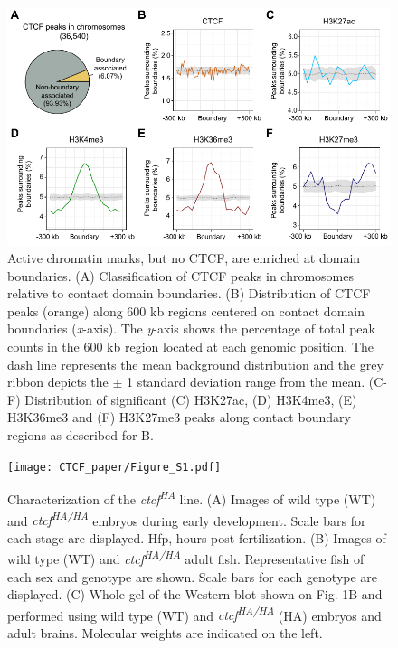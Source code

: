 		\newpage

		\begin{figure}[h!]
			\centering
			\includegraphics{CTCF_paper/Figure_4.pdf}
  			\caption[three]{Active chromatin marks, but no CTCF, are enriched at domain boundaries.
(A) Classification of CTCF peaks in chromosomes relative to contact domain boundaries.
(B) Distribution of CTCF peaks (orange) along 600 kb regions centered on contact domain boundaries (\textit{x}-axis). The \textit{y}-axis shows the percentage of total peak counts in the 600 kb region located at each genomic position. The dash line represents the mean background distribution and the grey ribbon depicts the $\pm$ 1 standard deviation range from the mean.
(C-F) Distribution of significant (C) H3K27ac, (D) H3K4me3, (E) H3K36me3 and (F) H3K27me3 peaks along contact boundary regions as described for B.}
			\label{four}
		\end{figure}


		\newpage

		\renewcommand{\figurename}{Supplemental Figure}
		\setcounter{figure}{0}

		\begin{figure}[h!]
			\centering
			\texttt{[image: CTCF\_paper/Figure\_S1.pdf]}
  			\caption[five]{Characterization of the \textit{ctcf\textsuperscript{HA}} line.
(A) Images of wild type (WT) and \textit{ctcf\textsuperscript{HA/HA}} embryos during early development. Scale bars for each stage are displayed. Hfp, hours post-fertilization.
(B) Images of wild type (WT) and \textit{ctcf\textsuperscript{HA/HA}} adult fish. Representative fish of each sex and genotype are shown. Scale bars for each genotype are displayed.
(C) Whole gel of the Western blot shown on Fig. 1B and performed using wild type (WT) and \textit{ctcf\textsuperscript{HA/HA}} (HA) embryos and adult brains. Molecular weights are indicated on the left.}
			\label{five}
		\end{figure}

